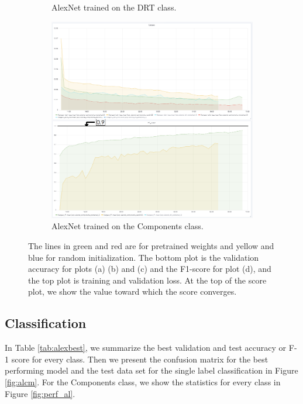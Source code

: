 \begin{figure}
{\begin{subfigure}[b]{.6\textwidth}
\caption{AlexNet trained on the DRT class.}
\label{fig:alexinit_drt}
\end{subfigure}%
\begin{subfigure}[b]{.6\textwidth}
\centering
\includegraphics[width=.95\textwidth]{figures/04-al_components_acc.PNG}
\caption{AlexNet trained on the Components class.}
\label{fig:alexinit_comp}
\end{subfigure}%
}
\caption[Training and validation plots for AlexNet]{The lines in green and red are for pretrained weights and yellow and blue for random initialization. The bottom plot is the validation accuracy for plots (a) (b) and (c) and the F1-score for plot (d), and the top plot is training and validation loss. At the top of the score plot, we show the value toward which the score converges.}
\label{fig:plotsalex}
\end{figure}


\subsection{Classification}
In Table \ref{tab:alexbest}, we summarize the best validation and test accuracy or F-1 score for every class. Then we present the confusion matrix for the best performing model and the test data set for the single label classification in Figure \ref{fig:alcm}. For the Components class, we show the statistics for every class in Figure \ref{fig:perf_al}. 

